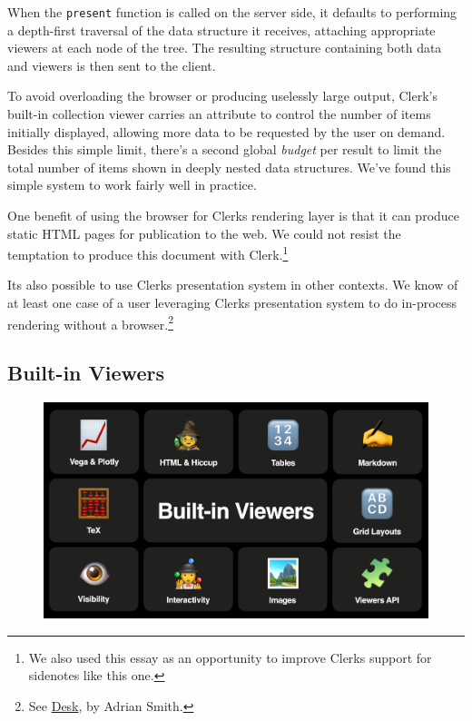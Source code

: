 \documentclass[sigconf,screen]{acmart}
\newcommand{\passthrough}[1]{#1}
\begin{document}
When the \passthrough{\lstinline!present!} function is called on the server side, it defaults to performing a depth-first traversal of the data structure it receives, attaching appropriate viewers at each node of the tree. The resulting structure containing both data and viewers is then sent to the client.

To avoid overloading the browser or producing uselessly large output, Clerk's built-in collection viewer carries an attribute to control the number of items initially displayed, allowing more data to be requested by the user on demand. Besides this simple limit, there's a second global \emph{budget} per result to limit the total number of items shown in deeply nested data structures. We've found this simple system to work fairly well in practice.

One benefit of using the browser for Clerk\textquotesingle s rendering layer is that it can produce static HTML pages for publication to the web. We could not resist the temptation to produce this document with Clerk.\footnote{We also used this essay as an opportunity to improve Clerk\textquotesingle s support for sidenotes like this one.}

It\textquotesingle s also possible to use Clerk\textquotesingle s presentation system in other contexts. We know of at least one case of a user leveraging Clerk\textquotesingle s presentation system to do in-process rendering without a browser.\footnote{See \href{https://github.com/phronmophobic/desk}{Desk}, by Adrian Smith.}

\hypertarget{built-in-viewers}{%
\subsection{Built-in Viewers}\label{built-in-viewers}}

\begin{figure}
\hypertarget{built-in-viewers}{%
\centering
\includegraphics{images/built-in-viewers.png}
\caption{}\label{built-in-viewers}
}
\end{figure}
\end{document}
